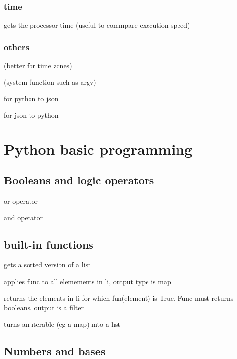 		\subsubsection{time}


			 gets the processor time (useful to commpare execution speed)


		\subsubsection{others}

			 (better for time zones)

			 (system function such as argv)


			 for python to json 

			 for json to python


\section{Python basic programming}

	\subsection{Booleans and logic operators}

		\code{|} or operator

		\code{\&} and operator

	\subsection{built-in functions}





		 gets a sorted version of a list

		 applies func to all elemements in li, output type is map

		 returns the elements in li for which fun(element) is True. Func must returns booleans. output is a filter

		 turns an iterable (eg a map) into a list


	\subsection{Numbers and bases}

